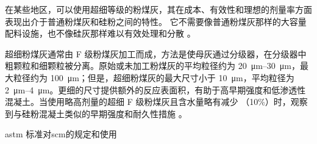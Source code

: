 在某些地区，可以使用超细等级的粉煤灰，其在成本、有效性和理想的剂量率方面表现出介于普通粉煤灰和硅粉之间的特性。 它不需要像普通粉煤灰那样的大容量配料设施，也不像硅灰那样难以有效处理和分散 \cite{day2006c}。

超细粉煤灰通常由 F 级粉煤灰加工而成，方法是使母灰通过分级器，在分级器中粗颗粒和细颗粒被分离。原始或未加工粉煤灰的平均粒径约为 \qtyrange{20}{30}{\micro m}，最大粒径约为 \qty{100}{\micro m}；但是，超细粉煤灰的最大尺寸小于 \qty{10}{\micro m}，平均粒径为 \qtyrange{2}{4}{\micro m}。更细的尺寸提供额外的反应表面积，有助于高早期强度和低渗透性混凝土。当使用略高剂量的超细 F 级粉煤灰且含水量略有减少 （10\%）时，观察到与硅粉混凝土类似的早期强度和耐久性措施 \cite{obla2003p}。

\begin{table}
  \caption{\acrshort*{astm} 标准对\gls{scm}的规定和使用}
  \label{tab:scms-astm-use}
  
\end{table}

